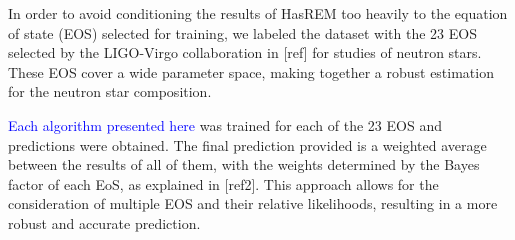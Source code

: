 In order to avoid conditioning the results of HasREM too heavily to the equation of state (EOS) selected for training, we labeled the dataset with the 23 EOS selected by the LIGO-Virgo collaboration in [ref] for studies of neutron stars. These EOS cover a wide parameter space, making together a robust estimation for the neutron star composition.

\textcolor{blue}{Each algorithm presented here} was trained for each of the 23 EOS and predictions were obtained. The final prediction provided is a weighted average between the results of all of them, with the weights determined by the Bayes factor of each EoS, as explained in [ref2]. This approach allows for the consideration of multiple EOS and their relative likelihoods, resulting in a more robust and accurate prediction.

